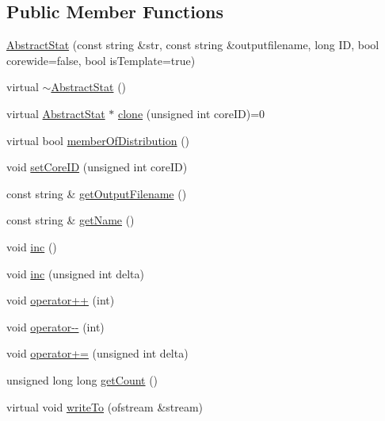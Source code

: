\subsection*{Public Member Functions}
\begin{DoxyCompactItemize}
\item 
\hyperlink{classAbstractStat_a1fefc0acf03b173a655286a1ecb51618}{AbstractStat} (const string \&str, const string \&outputfilename, long ID, bool corewide=false, bool isTemplate=true)
\item 
virtual \hyperlink{classAbstractStat_a68d27fe0b5592399df77bb6e681e8b5e}{$\sim$AbstractStat} ()
\item 
virtual \hyperlink{classAbstractStat}{AbstractStat} $\ast$ \hyperlink{classAbstractStat_aed9a458491d92fb2cc3c458990d9fab1}{clone} (unsigned int coreID)=0
\item 
virtual bool \hyperlink{classAbstractStat_a8b819d1de7dd14edb854545329484506}{memberOfDistribution} ()
\item 
void \hyperlink{classAbstractStat_a4ba3cbe5bcbbf922be0b0b0101c1931c}{setCoreID} (unsigned int coreID)
\item 
const string \& \hyperlink{classAbstractStat_acc7e262331b3d7d15bff6da1656f663c}{getOutputFilename} ()
\item 
const string \& \hyperlink{classAbstractStat_a6a34495d13bcc699bdc93097b9126e1c}{getName} ()
\item 
void \hyperlink{classAbstractStat_a8680b7ffff5ee2ce31f705c62d1c0c17}{inc} ()
\item 
void \hyperlink{classAbstractStat_ad9686be94bf46c5a6b13905de73ae839}{inc} (unsigned int delta)
\item 
void \hyperlink{classAbstractStat_a6f7ce3ecac297732ca764cab841fe5c1}{operator++} (int)
\item 
void \hyperlink{classAbstractStat_a034988d1f13e337dd03a440dbf0220d5}{operator-\/-\/} (int)
\item 
void \hyperlink{classAbstractStat_abda03736dff81db196a3ba5f68bfa59b}{operator+=} (unsigned int delta)
\item 
unsigned long long \hyperlink{classAbstractStat_a90056a981a2a113065d1afb4006e4d00}{getCount} ()
\item 
virtual void \hyperlink{classAbstractStat_aa4760247da47c70d7345de5d881f59cb}{writeTo} (ofstream \&stream)
\end{DoxyCompactItemize}
